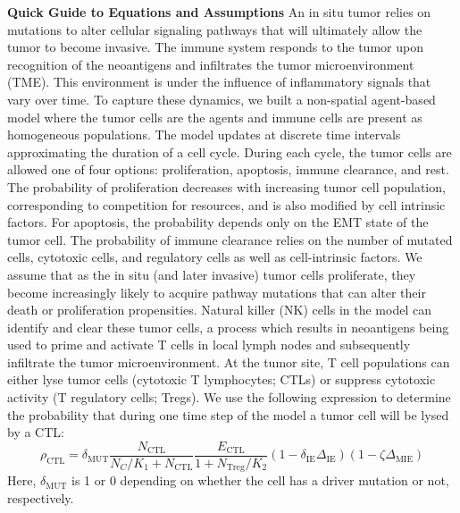 \documentclass[11pt]{article}
\begin{document}
\begin{framed}
    {\bf Quick Guide to Equations and Assumptions}
\newline
An in situ tumor relies on mutations to alter cellular signaling pathways that will ultimately allow the tumor to become invasive. The immune system responds to the tumor upon recognition of the neoantigens and infiltrates the tumor microenvironment (TME). This environment is under the influence of inflammatory signals that vary over time.
%
\newline
    To capture these dynamics, we built a non-spatial agent-based model where the tumor cells are the agents and immune cells are present as homogeneous populations.
    The model updates at discrete time intervals approximating the duration of a cell cycle.
    During each cycle, the tumor cells are allowed one of four options: proliferation, apoptosis, immune clearance, and rest.
    The probability of proliferation decreases with increasing tumor cell population, corresponding to competition for resources, and is also modified by cell intrinsic factors.
    For apoptosis, the probability depends only on the EMT state of the tumor cell.
    The probability of immune clearance relies on the number of mutated cells, cytotoxic cells, and regulatory cells as well as cell-intrinsic factors.
    \newline
    We assume that as the in situ (and later invasive) tumor cells proliferate, they become increasingly likely to acquire pathway mutations that can alter their death or proliferation propensities. Natural killer (NK) cells in the model can identify and clear these tumor cells, a process which results in neoantigens being used to prime and activate T cells in local lymph nodes and subsequently infiltrate the tumor microenvironment. At the tumor site, T cell populations can either lyse tumor cells (cytotoxic T lymphocytes; CTLs) or suppress cytotoxic activity (T regulatory cells; Tregs).
    We use the following expression to determine the probability that during one time step of the model a tumor cell will be lysed by a CTL:
    $$\rho_{\text{CTL}} =\delta_{\text{MUT}} \frac{N_{\text{CTL}}}{N_C/K_{1}+N_{\text{CTL}}}  \frac{E_{\text{CTL}}}{1+N_{\text{Treg}}/K_2} (1-\delta_{\text{IE}}\Delta_{\text{IE}})(1-\zeta \Delta_{\text{MIE}})$$
    Here, $\delta_\text{MUT}$ is 1 or 0 depending on whether the cell has a driver mutation or not, respectively.

\end{framed}
\end{document}
